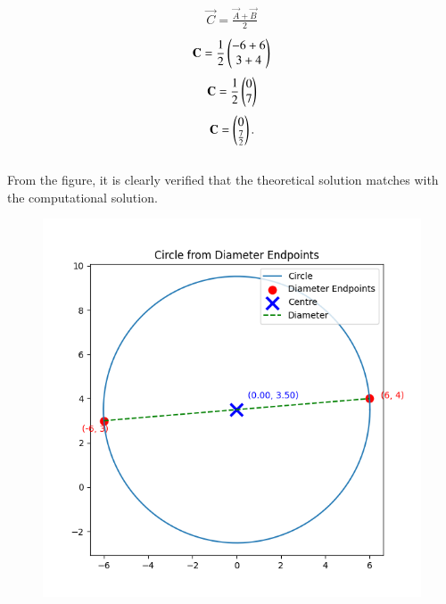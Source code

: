 \documentclass[journal]{IEEEtran}
\begin{document}
\begin{align}
    \vec{C}=\frac{\vec{A}+\vec{B}}{2} 
\end{align}
\begin{align}
    \vec{C}=\frac{1}{2}\myvec{-6+6 \\ 3+4} 
\end{align}
\begin{align}
    \vec{C}=\frac{1}{2} \myvec{0 \\ 7} 
\end{align}
\begin{align}
    \vec{C}=\myvec{0\\\tfrac{7}{2}}.
\end{align}
\\
From the figure, it is clearly verified that the theoretical solution matches with the computational solution.\\
\begin{figure}[h!]
    \centering
    \includegraphics[height=0.5\textheight, keepaspectratio]{figs/Figure_1.png}
    \label{figure_1}
\end{figure}
\end{document}
